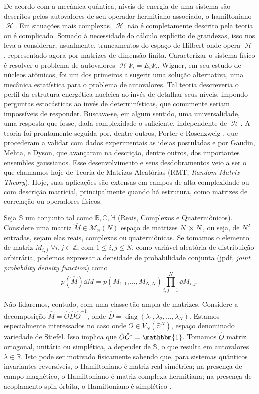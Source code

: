\documentclass[11pt,twocolumn]{article}
\newcommand{\matriz}[1]{\hat#1}
\newcommand{\mmany}[2]{ #1_1, #1_2, \dots, #1_#2 }
\DeclareMathOperator{\diag}{diag}
\DeclareMathOperator{\Hf}{\mathcal{H}}
\newcommand{\C}{\mathbb{C}}
\newcommand{\R}{\mathbb{R}}
\newcommand{\Z}{\mathbb{Z}}
\newcommand{\p}{p} %
\newcommand{\Se}{\mathbb{S}}
\newcommand{\He}{\mathbb{H}}
\numberwithin{equation}{section} %
\begin{document}
De acordo com a mecânica quântica, níveis de energia de uma sistema são descritos pelos autovalores de seu operador hermitiano associado, o hamiltoniano $\Hf$. Em situações mais complexas, $\Hf$ não é completamente descrito pela teoria ou é complicado. Somado à necessidade do cálculo explícito de grandezas, isso nos leva a considerar, usualmente, truncamentos do espaço de Hilbert onde opera $\Hf$, representado agora por matrizes de dimensão finita. Caracterizar o sistema físico é resolver o problema de autovalores $\Hf \Psi_i = E_i \Psi_i$. Wigner, em seu estudo de núcleos atômicos, foi um dos primeiros a sugerir uma solução alternativa, uma mecânica estatística para o problema de autovalores. Tal teoria descreveria o perfil da estrutura energética nucleica ao invés de detalhar seus níveis, impondo perguntas estocásticas ao invés de determinísticas, que comumente seriam impossíveis de responder. Buscava-se, em algum sentido, uma universalidade, uma resposta que fosse, dada complexidade o suficiente, independente de $\Hf$. A teoria foi prontamente seguida por, dentre outros, Porter e Rosenzweig , que procederam a validar com dados experimentais as ideias postuladas e por Gaudin, Mehta, e Dyson, que avançaram na descrição, dentre outros, dos importantes ensembles gaussianos. Esse desenvolvimento e seus desdobramentos veio a ser o que chamamos hoje de Teoria de Matrizes Aleatórias (RMT, \textit{Random Matrix Theory}). Hoje, suas aplicações são extensas em campos de alta complexidade ou com descrição matricial, principalmente quando há estrutura, como matrizes de correlação ou operadores físicos.

Seja $\Se$ um conjunto tal como $\R, \C, \He $ (Reais, Complexos e Quaterniônicos). Considere uma matriz $\matriz{M} \in \mathcal{M}_{\Se}(N)$ espaço de matrizes $N \cross N$, ou seja, de $N^2$ entradas, sejam elas reais, complexas ou quaterniônicas. Se tomamos o elemento de matriz $M_{i,j}$ $\forall i, j \in \Z$, com $1 \leq i, j \leq N$, como variável aleatória de distribuição arbitrária, podemos expressar a densidade de probabilidade conjunta (jpdf, \textit{joint probability density function}) como $$\p(\hat{M}) \dd M = \p(M_{1,1}, \dots, M_{N,N}) \prod_{i,j=1}^{N} \dd M_{i,j}.$$

Não lidaremos, contudo, com uma classe tão ampla de matrizes. Considere a decomposição $\matriz{M} = \matriz{O} \matriz{D} \matriz{O}^{-1}$, onde $\matriz{D} = \diag(\mmany{\lambda}{N})$. Estamos especialmente interessados no caso onde $\matriz{O} \in V_N(\Se^N)$, espaço denominado variedade de Stiefel. Isso implica que $ \matriz{O} \matriz{O}^* = \mathbbm{1}$. Tomamos $\matriz{O}$ matriz ortogonal, unitária ou simplética, a depender de $\Se$, o que resulta em autovalores $\lambda \in \R$. Isto pode ser motivado fisicamente sabendo que, para sistemas quânticos invariantes reversíveis, o Hamiltoniano é matriz real simétrica; na presença de campo magnético, o Hamiltoniano é matriz complexa hermitiana; na presença de acoplamento spin-órbita, o Hamiltoniano é simplético \cite[Capítulo~2]{RMT-firstcourse-Potters}.
\end{document}
